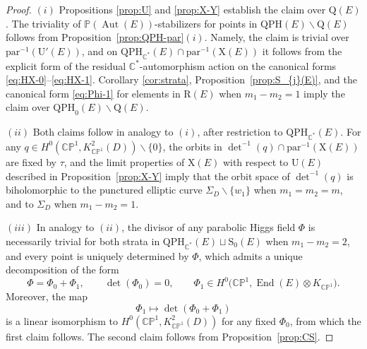 \documentclass[10pt,a4paper]{amsart}
\newcommand{\field}[1]{\ensuremath{\mathbb{#1}}}
\newcommand{\CC}{\field{C}}
\newcommand{\PP}{\field{P}}
\DeclareMathOperator{\Aut}{Aut}
\DeclareMathOperator{\End}{End}
\numberwithin{equation}{section}
\begin{document}
\begin{proof}
$(i)$ Propositions \ref{prop:U} and \ref{prop:X-Y} establish the claim over $\mathrm{Q}(E)$. The triviality of $\PP(\Aut(E))$-stabilizers for points in $\mathrm{QPH}(E)\backslash\mathrm{Q}(E)$ follows from Proposition~\ref{prop:QPH-par}$(i)$. Namely, the claim is trivial over $\mathrm{par}^{-1}(\mathrm{U}'(E))$, and on $\mathrm{QPH}_{\CC^{*}}(E)\cap\mathrm{par}^{-1}(\mathrm{X}(E))$ it follows from the explicit form of the residual $\CC^{*}$-automorphism action on the canonical forms \eqref{eq:HX-0}--\eqref{eq:HX-1}. Corollary \ref{cor:strata}, Proposition~\ref{prop:S_{j}(E)}, and the canonical form \eqref{eq:Phi-1} for elements in $\mathrm{R}(E)$ when $m_{1}-m_{2}=1$ imply the claim over $\mathrm{QPH}_{0}(E)\backslash\mathrm{Q}(E)$.

$(ii)$ Both claims follow in analogy to $(i)$, after restriction to $\mathrm{QPH}_{\CC^{*}}(E)$. For any $q\in H^{0}(\CC\PP^{1},K^{2}_{\CC\PP^{1}}(D))\backslash\{0\}$, the orbits in $\det^{-1}(q)\cap\mathrm{par}^{-1}(\mathrm{X}(E))$ are fixed by $\tau$, and the limit properties of $\mathrm{X}(E)$ with respect to $\mathrm{U}(E)$ described in Proposition~\ref{prop:X-Y} imply that the orbit space of $\det^{-1}(q)$ is biholomorphic to the punctured elliptic curve $\Sigma_{D}\backslash\{w_{1}\}$ when $m_{1}=m_{2}=m$, and to $\Sigma_{D}$ when $m_{1}-m_{2}=1$.

$(iii)$ In analogy to $(ii)$, the divisor of any parabolic Higgs field $\Phi$ is necessarily trivial for both strata in $\mathrm{QPH}_{\CC^{*}}(E)\sqcup \mathrm{S}_{0}(E)$ when $m_{1} - m_{2} = 2$, and every point is uniquely determined by $\Phi$, which admits a unique decomposition of the form
\[
\Phi = \Phi_{0} + \Phi_{1},\qquad
\det(\Phi_{0})=0,\qquad
\Phi_{1}\in H^{0}\bigl(\CC\PP^{1},\End(E)\otimes K_{\CC\PP^{1}}\bigr).
\]
Moreover, the map
\[
\Phi_{1}\mapsto \det(\Phi_{0}+ \Phi_{1})
\]
is a linear isomorphism to $H^{0}(\CC\PP^{1},K^{2}_{\CC\PP^{1}}(D))$ for any fixed $\Phi_{0}$, from which the first claim follows. The second claim follows from Proposition~\ref{prop:CS}.
\end{proof}
\end{document}
